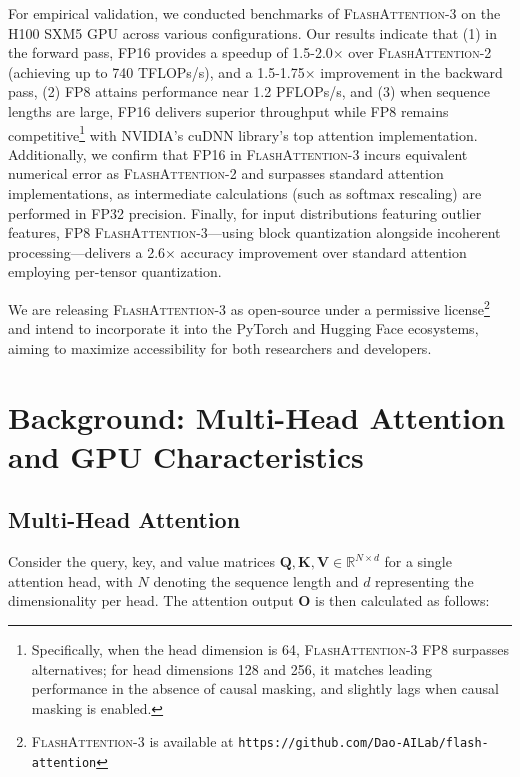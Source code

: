 For empirical validation, we conducted benchmarks of \textsc{FlashAttention-3} on the H100 SXM5 GPU across various configurations. Our results indicate that (1) in the forward pass, FP16 provides a speedup of 1.5-2.0$\times$ over \textsc{FlashAttention-2} (achieving up to 740 TFLOPs/s), and a 1.5-1.75$\times$ improvement in the backward pass, (2) FP8 attains performance near 1.2 PFLOPs/s, and (3) when sequence lengths are large, FP16 delivers superior throughput while FP8 remains competitive\footnote{Specifically, when the head dimension is 64, \textsc{FlashAttention-3} FP8 surpasses alternatives; for head dimensions 128 and 256, it matches leading performance in the absence of causal masking, and slightly lags when causal masking is enabled.} with NVIDIA’s cuDNN library’s top attention implementation. Additionally, we confirm that FP16 in \textsc{FlashAttention-3} incurs equivalent numerical error as \textsc{FlashAttention-2} and surpasses standard attention implementations, as intermediate calculations (such as softmax rescaling) are performed in FP32 precision. Finally, for input distributions featuring outlier features, FP8 \textsc{FlashAttention-3}—using block quantization alongside incoherent processing—delivers a 2.6$\times$ accuracy improvement over standard attention employing per-tensor quantization.

We are releasing \textsc{FlashAttention-3} as open-source under a permissive license\footnote{\textsc{FlashAttention-3}
  is available at \texttt{https://github.com/Dao-AILab/flash-attention}} and intend to incorporate it into the PyTorch and Hugging Face ecosystems, aiming to maximize accessibility for both researchers and developers.

\section{Background: Multi-Head Attention and GPU Characteristics}
\label{sec:background}

\subsection{Multi-Head Attention}
\label{subsec:multi_head_attn}

Consider the query, key, and value matrices $\mathbf{Q}, \mathbf{K}, \mathbf{V} \in \mathbb{R}^{N \times d}$ for a single attention head, with $N$ denoting the sequence length and $d$ representing the dimensionality per head. The attention output $\mathbf{O}$ is then calculated as follows:

